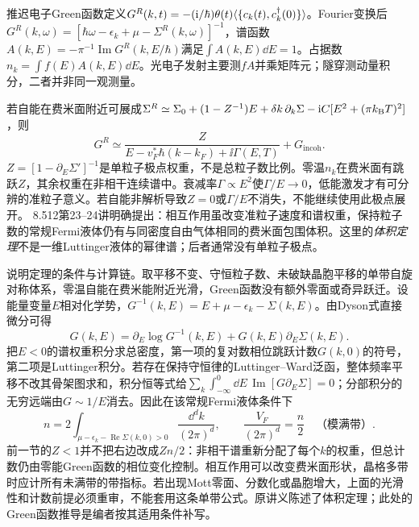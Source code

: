 \label{ch:fermi}
推迟电子Green函数定义$G^R(k,t)=-(\mathrm i/\hbar)\theta(t)\langle \{c_k(t),c_k^\dagger(0)\}\rangle$。Fourier变换后$G^R(k,\omega)=[\hbar\omega-\epsilon_k+\mu-\Sigma^R(k,\omega)]^{-1}$，谱函数$A(k,E)=-\pi^{-1}\operatorname{Im}G^R(k,E/\hbar)$满足$\int A(k,E)\dd E=1$。占据数$n_k=\int f(E)A(k,E)\dd E$。光电子发射主要测$fA$并乘矩阵元；隧穿测动量积分，二者并非同一观测量。

若自能在费米面附近可展成$\Sigma^R\simeq\Sigma_0+(1-Z^{-1})E+\delta k\,\partial_k\Sigma-\mathrm i C[E^2+(\pi k_{\mathrm B} T)^2]$，则
\begin{equation}
G^R\simeq\frac Z{E-v_F^*\hbar(k-k_F)+\ii\Gamma(E,T)}+G_{\mathrm{incoh}}.
\end{equation}
$Z=[1-\partial_E\Sigma']^{-1}$是单粒子极点权重，不是总粒子数比例。零温$n_k$在费米面有跳跃$Z$，其余权重在非相干连续谱中。衰减率$\Gamma\propto E^2$使$\Gamma/E\to0$，低能激发才有可分辨的准粒子意义。若自能非解析导致$Z=0$或$\Gamma/E$不消失，不能继续使用此极点展开。
8.512第23--24讲明确提出：相互作用虽改变准粒子速度和谱权重，保持粒子数的常规Fermi液体仍有与同密度自由气体相同的费米面包围体积。这里的\emph{体积定理}不是一维Luttinger液体的幂律谱；后者通常没有单粒子极点。

说明定理的条件与计算链。取平移不变、守恒粒子数、未破缺晶胞平移的单带自旋对称体系，零温自能在费米能附近光滑，Green函数没有额外零面或奇异跃迁。设能量变量$E$相对化学势，$G^{-1}(k,E)=E+\mu-\epsilon_k-\Sigma(k,E)$。由Dyson式直接微分可得
\begin{equation}
G(k,E)=\partial_E\log G^{-1}(k,E)+G(k,E)\partial_E\Sigma(k,E).
\end{equation}
把$E<0$的谱权重积分求总密度，第一项的复对数相位跳跃计数$G(k,0)$的符号，第二项是Luttinger积分。若存在保持守恒律的Luttinger--Ward泛函，整体频率平移不改其骨架图求和，积分恒等式给$\sum_k\int_{-\infty}^{0}\!\dd E\,\operatorname{Im}[G\partial_E\Sigma]=0$；分部积分的无穷远端由$G\sim1/E$消去。因此在该常规Fermi液体条件下
\begin{equation}
n=2\int_{\mu-\epsilon_k-\operatorname{Re}\Sigma(k,0)>0}
\frac{\dd^dk}{(2\pi)^d},
\qquad \frac{V_F}{(2\pi)^d}=\frac n2
\quad\text{（模满带）}.
\end{equation}
前一节的$Z<1$并不把右边改成$Zn/2$：非相干谱重新分配了每个$k$的权重，但总计数仍由零能Green函数的相位变化控制。相互作用可以改变费米面形状，晶格多带时应计所有未满带的带指标。若出现Mott零面、分数化或晶胞增大，上面的光滑性和计数前提必须重审，不能套用这条单带公式。原讲义陈述了体积定理；此处的Green函数推导是编者按其适用条件补写。

